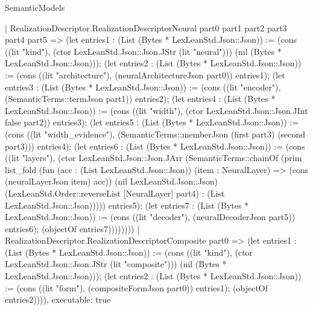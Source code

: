 \begin{lexlean}{SemanticModels}
\begin{semanticmodule}
{    | RealizationDescriptor.RealizationDescriptorNeural part0 part1 part2 part3 part4 part5 => (let entries1 : (List (Bytes * LexLeanStd.Json::Json)) := (cons ((lit "kind"), (ctor LexLeanStd.Json::Json.JStr (lit "neural"))) (nil (Bytes * LexLeanStd.Json::Json))); (let entries2 : (List (Bytes * LexLeanStd.Json::Json)) := (cons ((lit "architecture"), (neuralArchitectureJson part0)) entries1); (let entries3 : (List (Bytes * LexLeanStd.Json::Json)) := (cons ((lit "encoder"), (SemanticTerms::termJson part1)) entries2); (let entries4 : (List (Bytes * LexLeanStd.Json::Json)) := (cons ((lit "width"), (ctor LexLeanStd.Json::Json.JInt false part2)) entries3); (let entries5 : (List (Bytes * LexLeanStd.Json::Json)) := (cons ((lit "width_evidence"), (SemanticTerms::memberJson (first part3) (second part3))) entries4); (let entries6 : (List (Bytes * LexLeanStd.Json::Json)) := (cons ((lit "layers"), (ctor LexLeanStd.Json::Json.JArr (SemanticTerms::chainOf (prim list_fold (fun (acc : (List LexLeanStd.Json::Json)) (item : NeuralLayer) => (cons (neuralLayerJson item) acc)) (nil LexLeanStd.Json::Json) (LexLeanStd.Order::reverseList [NeuralLayer] part4) : (List LexLeanStd.Json::Json))))) entries5); (let entries7 : (List (Bytes * LexLeanStd.Json::Json)) := (cons ((lit "decoder"), (neuralDecoderJson part5)) entries6); (objectOf entries7))))))))
    | RealizationDescriptor.RealizationDescriptorComposite part0 => (let entries1 : (List (Bytes * LexLeanStd.Json::Json)) := (cons ((lit "kind"), (ctor LexLeanStd.Json::Json.JStr (lit "composite"))) (nil (Bytes * LexLeanStd.Json::Json))); (let entries2 : (List (Bytes * LexLeanStd.Json::Json)) := (cons ((lit "form"), (compositeFormJson part0)) entries1); (objectOf entries2)))),
  executable: true
}


\end{semanticmodule}
\end{lexlean}
